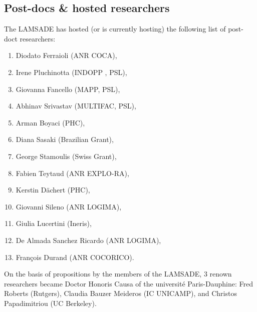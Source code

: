 \documentclass[version=last, pagesize, twoside=semi, DIV=calc, 12pt, a4paper, french, english, bibliography=totoc]{scrartcl}
\begin{document}
%
%


\subsection{Post-docs \& hosted researchers} %

The LAMSADE has hosted (or is currently hosting) the following list of post-doct researchers: 
\begin{enumerate}
\item 
Diodato Ferraioli (ANR COCA), 
\item Irene Pluchinotta (INDOPP , PSL),  
\item Giovanna Fancello (MAPP, PSL), 
\item Abhinav Srivastav (MULTIFAC, PSL), 
\item Arman Boyaci (PHC), 
\item Diana Sasaki (Brazilian Grant), 
\item George Stamoulis (Swiss Grant), 
\item Fabien Teytaud (ANR EXPLO-RA), 
\item Kerstin D\"achert (PHC), 
\item Giovanni Sileno (ANR LOGIMA), 
\item Giulia Lucertini (Ineris), 
\item De Almada Sanchez Ricardo (ANR LOGIMA),
\item Fran\c cois Durand (ANR COCORICO). 
\end{enumerate}

On the basis of propositions by the members of the LAMSADE, 3 renown researchers became Doctor Honoris Causa of the universit\'e Paris-Dauphine: Fred Roberts (Rutgers), Claudia Bauzer Meideros (IC UNICAMP), and Christos Papadimitriou (UC Berkeley). 
\end{document}
